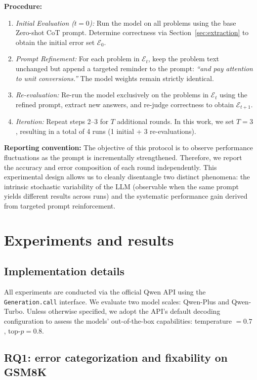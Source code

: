\documentclass{article}
\begin{document}
\textbf{Procedure:}
\begin{enumerate}
    \item \textit{Initial Evaluation ($t=0$):} Run the model on all problems using the base Zero-shot CoT prompt. Determine correctness via Section~\ref{sec:extraction} to obtain the initial error set $\mathcal{E}_0$.
    \item \textit{Prompt Refinement:} For each problem in $\mathcal{E}_t$, keep the problem text unchanged but append a targeted reminder to the prompt: \textit{``and pay attention to unit conversions.''} The model weights  remain strictly identical.
    \item \textit{Re-evaluation:} Re-run the model exclusively on the problems in $\mathcal{E}_t$ using the refined prompt, extract new answers, and re-judge correctness to obtain $\mathcal{E}_{t+1}$.
    \item \textit{Iteration:} Repeat steps 2--3 for $T$ additional rounds. In this work, we set $T=3$, resulting in a total of 4 runs (1 initial + 3 re-evaluations).
\end{enumerate}

\textbf{Reporting convention:}
The objective of this protocol is to observe performance fluctuations as the prompt is incrementally strengthened. Therefore, we report the accuracy and error composition of each round independently. This experimental design allows us to cleanly disentangle two distinct phenomena: the intrinsic stochastic variability of the LLM (observable when the same prompt yields different results across runs) and the systematic performance gain derived from targeted prompt reinforcement.


\section{Experiments and results}
\label{sec:experiments}
\subsection{Implementation details}
All experiments are conducted via the official Qwen API using the \texttt{Generation.call} interface. We evaluate two model scales: Qwen-Plus and Qwen-Turbo. Unless otherwise specified, we adopt the API's default decoding configuration to assess the models' out-of-the-box capabilities: temperature $= 0.7$, top-$p = 0.8$. 
\subsection{RQ1: error categorization and fixability on GSM8K}
\label{sec:rq1}
\end{document}
